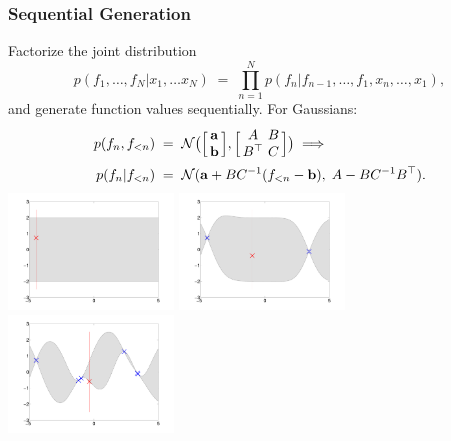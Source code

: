\begin{frame}
\frametitle{Sequential Generation}

Factorize the joint distribution
\[
p(f_1,\ldots,f_N|x_1,\ldots x_N)\;=\;\prod_{n=1}^N
p(f_n|f_{n-1},\ldots,f_1,x_n,\ldots,x_1),
\]
and generate function values sequentially. For Gaussians:
\begin{align*}
p(f_n,f_{<n})&\;=\;{\cal N}\big(\Big[\!\!\begin{array}{c}{\bf a} \\ {\bf b}
\end{array}\!\!\Big],\Big[\!\!\begin{array}{cc}A\!\!&\!\!B \\ B^\top\!\!&\!\!C\end{array}\!\!\Big]\big)
\;\Longrightarrow\\
p(f_n|f_{<n})&\;=\;{\cal N}({\bf a}+BC^{-1}(f_{<n}-\bfb),\; A-BC^{-1}B^\top).
\end{align*}
\includegraphics[width=0.33\textwidth]{seq_fullGP_M1.pdf}
\includegraphics[width=0.33\textwidth]{seq_fullGP_M3.pdf}
\includegraphics[width=0.33\textwidth]{seq_fullGP_M7.pdf}
\end{frame}


